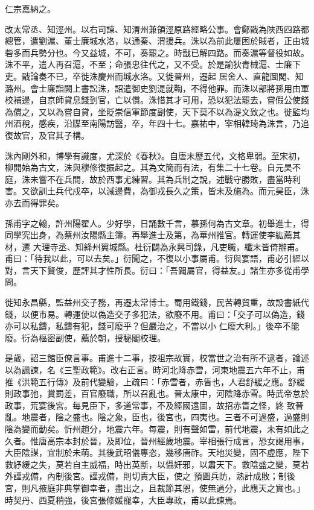 \begin{pinyinscope}
 仁宗嘉納之。



 改太常丞、知涇州。以右司諫、知渭州兼領涇原路經略公事。會鄭戩為陜西四路都總管，遣劉滬、董士廉城水洛，以通秦、渭援兵。洙以為前此屢困於賊者，正由城砦多而兵勢分也。今又益城，不可，奏罷之。時戩已解四路。而奏滬等督役如故。洙不平，遣人再召滬，不至；命張忠往代之，又不受。於是諭狄青械滬、士廉下吏。戩論奏不已，卒徙洙慶州而城水洛。又徙晉州，遷起
 居舍人、直龍圖閣、知潞州。會士廉詣闕上書訟洙，詔遣御史劉湜就鞫，不得他罪。而洙以部將孫用由軍校補邊，自京師貸息錢到官，亡以償。洙惜其才可用，恐以犯法罷去，嘗假公使錢為償之，又以為嘗自貸，坐貶崇信軍節度副使，天下莫不以為湜文致之也。徙監均州酒稅，感疾，沿牒至南陽訪醫，卒，年四十七。嘉祐中，宰相韓琦為洙言，乃追復故官，及官其子構。



 洙內剛外和，博學有識度，尤深於《春秋》。自唐末歷五代，文格卑弱。至宋初，
 柳開始為古文，洙與穆修復振起之。其為文簡而有法，有集二十七卷。自元昊不庭，洙未嘗不在兵間，故於西事尤練習。其為兵制之說，述戰守勝敗，盡當時利害。又欲訓土兵代戍卒，以減邊費，為御戎長久之策，皆未及施為。而元昊臣，洙亦去而得罪矣。



 孫甫字之翰，許州陽翟人。少好學，日誦數千言，慕孫何為古文章。初舉進士，得同學究出身，為蔡州汝陽縣主簿。再舉進士及第，為華州推官。轉運使李紘薦其材，遷
 大理寺丞、知絳州翼城縣。杜衍闢為永興司錄，凡吏職，纖末皆倚辦甫。甫曰：「待我以此，可以去矣。」衍聞之，不復以小事屬甫。衍與宴語，甫必引經以對，言天下賢俊，歷評其才性所長。衍曰：「吾闢屬官，得益友。」諸生亦多從甫學問。



 徙知永昌縣，監益州交子務，再遷太常博士。蜀用鐵錢，民苦轉貿重，故設書紙代錢，以便市易。轉運使以偽造交子多犯法，欲廢不用。甫曰：「交子可以偽造，錢亦可以私鑄，私鑄有犯，錢可廢乎？但嚴治之，不當以小
 仁廢大利。」後卒不能廢。衍為樞密副使，薦於朝，授秘閣校理。



 是歲，詔三館臣僚言事。甫進十二事，按祖宗故實，校當世之治有所不逮者，論述以為諷諫，名《三聖政範》。改右正言。時河北降赤雪，河東地震五六年不止，甫推《洪範五行傳》及前代變驗，上疏曰：「赤雪者，赤眚也，人君舒緩之應。舒緩則政事弛，賞罰差，百官廢職，所以召亂也。晉太康中，河陰降赤雪。時武帝怠於政事，荒宴後宮。每見臣下，多道常事，不及經國遠圖，故招赤眚之怪，終
 致晉亂。地震者，陰之盛也。陰之象，臣也，後宮也，四夷也。三者不可過盛，過盛則陰為變而動矣。忻州趙分，地震六年。每震，則有聲如雷，前代地震，未有如此之久者。惟唐高宗本封於晉，及即位，晉州經歲地震。宰相張行成言，恐女謁用事，大臣陰謀，宜制於未萌。其後武昭儀專恣，幾移唐祚。天地災變，固不虛應，陛下救紓緩之失，莫若自主威福，時出英斷，以懾奸邪，以肅天下。救陰盛之變，莫若外謹戎備，內制後宮。謹戎備，則切責大臣，使之
 預圖兵防，熟計成敗；制後宮，則凡掖庭非典掌御幸者，盡出之，且裁節其恩，使無過分，此應天之實也。」時契丹、西夏稍強，後宮張修媛寵幸，大臣專政，甫以此諫焉。




\end{pinyinscope}
